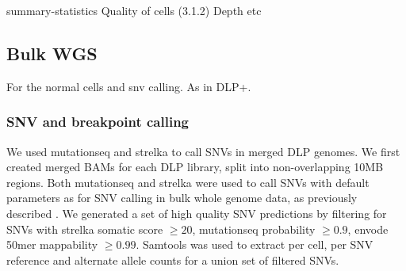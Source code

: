 \documentclass{article}
\begin{document}

\begin{comment}

\end{comment}

summary-statistics
Quality of cells (3.1.2)
Depth
etc

\subsection{Bulk WGS}
For the normal cells and snv calling. 
As in DLP+.

\subsubsection*{SNV and breakpoint calling}

We used mutationseq \citep{Ding:2012nr} and strelka \citep{Saunders:2012fr} to call SNVs in merged DLP genomes.
We first created merged BAMs for each DLP library, split into non-overlapping 10MB regions.
Both mutationseq and strelka were used to call SNVs with default parameters as for SNV calling in bulk whole genome data, as previously described \citep{McPherson:2016ly}.
We generated a set of high quality SNV predictions by filtering for SNVs with strelka somatic score $\geq 20$, mutationseq probability $\geq 0.9$, envode 50mer mappability $\geq 0.99$.
Samtools was used to extract per cell, per SNV reference and alternate allele counts for a union set of filtered SNVs.
\end{document}
